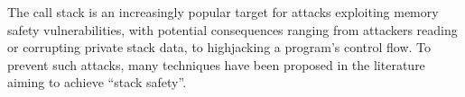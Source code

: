 \documentclass[acmsmall,review,anonymous]{acmart}\settopmatter{printfolios=true,printccs=false,printacmref=false}
\begin{document}
\newcommand*{\MemoryLabel}[3]{\raisebox{#2}{\makebox(0,0){\hspace{#1}#3}}}
 
% 

The call stack is an increasingly popular target for attacks
exploiting memory safety vulnerabilities, with potential consequences
ranging from attackers reading or corrupting private stack data, to
highjacking a program's control flow. To prevent such attacks, many
techniques have been proposed in the literature aiming to achieve ``stack
  safety''.
\end{document}
